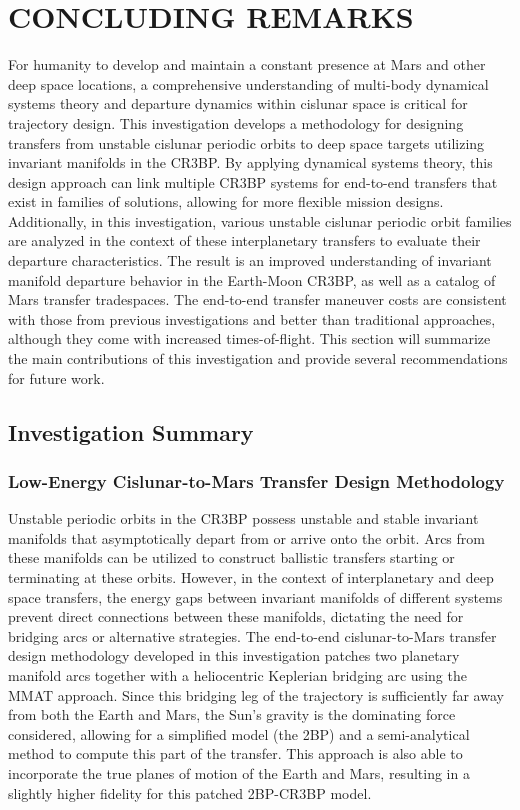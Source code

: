 \chapter{CONCLUDING REMARKS}
For humanity to develop and maintain a constant presence at Mars and other deep space locations, a
comprehensive understanding of multi-body dynamical systems theory and departure dynamics within
cislunar space is critical for trajectory design. This investigation develops a methodology for
designing transfers from unstable cislunar periodic orbits to deep space targets utilizing
invariant manifolds in the CR3BP. By applying dynamical systems theory, this design approach can
link multiple CR3BP systems for end-to-end transfers that exist in families of solutions, allowing
for more flexible mission designs. Additionally, in this investigation, various unstable cislunar
periodic orbit families are analyzed in the context of these interplanetary transfers to evaluate
their departure characteristics. The result is an improved understanding of invariant manifold
departure behavior in the Earth-Moon CR3BP, as well as a catalog of Mars transfer tradespaces. The
end-to-end transfer maneuver costs are consistent with those from previous investigations and
better than traditional approaches, although they come with increased times-of-flight. This
section will summarize the main contributions of this investigation and provide several
recommendations for future work.

\section{Investigation Summary}
\subsection{Low-Energy Cislunar-to-Mars Transfer Design Methodology}
Unstable periodic orbits in the CR3BP possess unstable and stable invariant manifolds that
asymptotically depart from or arrive onto the orbit. Arcs from these manifolds can be utilized to
construct ballistic transfers starting or terminating at these orbits. However, in the context of
interplanetary and deep space transfers, the energy gaps between invariant manifolds of different
systems prevent direct connections between these manifolds, dictating the need for bridging arcs
or alternative strategies. The end-to-end cislunar-to-Mars transfer design methodology developed in
this investigation patches two planetary manifold arcs together with a heliocentric Keplerian
bridging arc using the MMAT approach. Since this bridging leg of the trajectory is sufficiently far
away from both the Earth and Mars, the Sun's gravity is the dominating force considered, allowing
for a simplified model (the 2BP) and a semi-analytical method to compute this part of the transfer.
This approach is also able to incorporate the true planes of motion of the Earth and Mars,
resulting in a slightly higher fidelity for this patched 2BP-CR3BP model.

